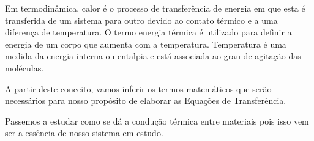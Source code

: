 Em termodinâmica, calor é o processo de transferência de energia em que esta é transferida de um sistema para outro devido ao contato térmico e a uma diferença de temperatura. O termo energia térmica é utilizado para definir a energia de um corpo que aumenta com a temperatura. Temperatura é uma medida da energia interna ou entalpia e está associada ao grau de agitação das moléculas.

A partir deste conceito, vamos inferir os termos matemáticos que serão necessários para nosso propósito de elaborar as Equações de Transferência.

Passemos a estudar como se dá a condução térmica entre materiais pois isso vem ser a essência de nosso sistema em estudo. 
